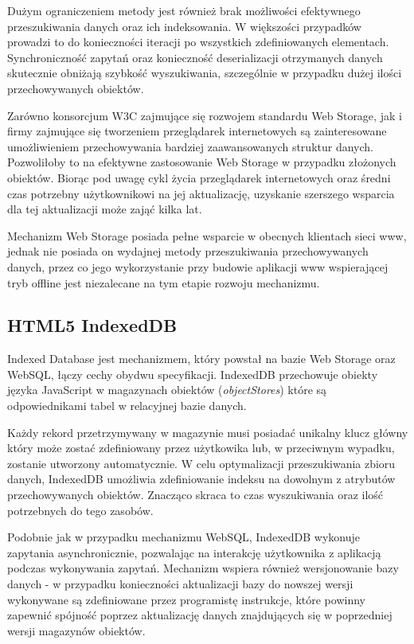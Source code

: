 Dużym ograniczeniem metody jest również brak możliwości efektywnego przeszukiwania danych oraz ich indeksowania. W większości przypadków prowadzi to do konieczności iteracji po wszystkich zdefiniowanych elementach. Synchroniczność zapytań oraz konieczność deserializacji otrzymanych danych skutecznie obniżają szybkość wyszukiwania, szczególnie w przypadku dużej ilości przechowywanych obiektów.

Zarówno konsorcjum W3C zajmujące się rozwojem standardu Web Storage, jak i firmy zajmujące się tworzeniem przeglądarek internetowych są zainteresowane umożliwieniem przechowywania bardziej zaawansowanych struktur danych. Pozwoliłoby to na efektywne zastosowanie Web Storage w przypadku złożonych obiektów. Biorąc pod uwagę cykl życia przeglądarek internetowych oraz średni czas potrzebny użytkownikowi na jej aktualizację, uzyskanie szerszego wsparcia dla tej aktualizacji może zająć kilka lat.

Mechanizm Web Storage posiada pełne wsparcie w obecnych klientach sieci www, jednak nie posiada on wydajnej metody przeszukiwania przechowywanych danych, przez co jego wykorzystanie przy budowie aplikacji www wspierającej tryb offline jest niezalecane na tym etapie rozwoju mechanizmu.

\subsection{HTML5 IndexedDB}
\label{sec:html5IndexedDB}

Indexed Database\cite{indexedDb} jest mechanizmem, który powstał na bazie Web Storage oraz WebSQL, łączy cechy obydwu specyfikacji. IndexedDB przechowuje obiekty języka JavaScript w magazynach obiektów (\emph{objectStores}) które są odpowiednikami tabel w relacyjnej bazie danych.

Każdy rekord przetrzymywany w magazynie musi posiadać unikalny klucz główny który może zostać zdefiniowany przez użytkowika lub, w przeciwnym wypadku, zostanie utworzony automatycznie. W celu optymalizacji przeszukiwania zbioru danych, IndexedDB umożliwia zdefiniowanie indeksu na dowolnym z atrybutów przechowywanych obiektów. Znacząco skraca to czas wyszukiwania oraz ilość potrzebnych do tego zasobów.

Podobnie jak w przypadku mechanizmu WebSQL, IndexedDB wykonuje zapytania asynchronicznie, pozwalając na interakcję użytkownika z aplikacją podczas wykonywania zapytań. Mechanizm wspiera również wersjonowanie bazy danych - w przypadku konieczności aktualizacji bazy do nowszej wersji wykonywane są zdefiniowane przez programistę instrukcje, które powinny zapewnić spójność poprzez aktualizację danych znajdujących się w poprzedniej wersji magazynów obiektów.

